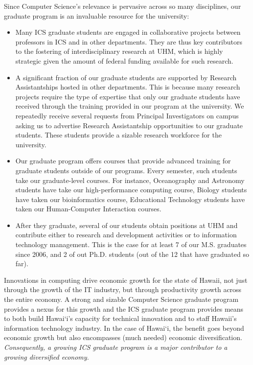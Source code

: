 \documentclass[12pt]{article}
\begin{document}
Since Computer Science's relevance is pervasive across so many
disciplines, our graduate program is an invaluable resource for the
university:
\begin{itemize}
  \item Many ICS graduate students are engaged in 
collaborative projects between professors in ICS and in other departments.
They are thus key contributors to the fostering of interdisciplinary
research at UHM, which is highly strategic given
the amount of federal funding available for such research. 
  \item A significant fraction of our graduate students are supported
by Research Assistantships hosted in other departments. This is because
many research projects require the type of expertise that only our
graduate students have received through the training provided in our
program at the university. We repeatedly receive several requests
from Principal Investigators on campus asking us to advertise 
Research Assistantship opportunities to our graduate students. These students
provide a sizable research workforce for the university.
  \item Our graduate program offers courses that provide advanced training 
for graduate students outside of our programs. Every semester, such students
take our graduate-level courses. For instance, Oceanography and Astronomy students have
take our high-performance computing course, Biology students have taken
our bioinformatics course, Educational Technology students have taken
our Human-Computer Interaction courses.
  \item After they graduate, several of our students obtain positions
at UHM and contribute either to research and development activities or
to information technology management.  This is the case for at least 7
of our M.S.  graduates since 2006, and 2 of out Ph.D. students (out of
the 12 that have graduated so far).
\end{itemize}

Innovations in computing drive economic growth for the state of Hawaii, not just
through the growth of the IT industry, but through productivity growth
across the entire economy.  A strong and sizable Computer Science
graduate program provides a nexus for this growth and the ICS graduate
program provides means to both build Hawai`i's capacity for
technical innovation and to staff Hawaii’s information technology
industry.  In the case of Hawai`i, the benefit goes beyond economic
growth but also encompasses (much needed) economic diversification. \emph{Consequently,
a growing ICS graduate program is a major contributor to a growing diversified
economy.}
\end{document}
